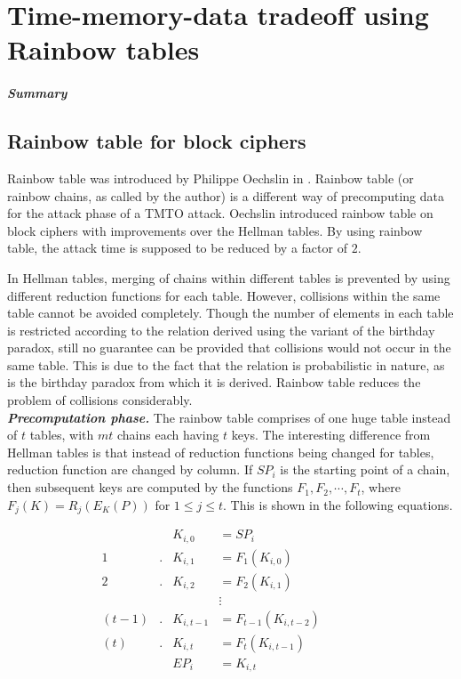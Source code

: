 \chapter{Time-memory-data tradeoff using Rainbow tables}
\label{chapter:tmdto-rainbow}

\paragraph{Summary}


\section{Rainbow table for block ciphers}
\label{sec:rainbow-block}

Rainbow table was introduced by Philippe Oechslin in \cite{oechslin:mfc}. Rainbow table (or rainbow chains, as called by the author) is a different way of precomputing data for the attack phase of a TMTO attack. Oechslin introduced rainbow table on block ciphers with improvements over the Hellman tables. By using rainbow table, the attack time is supposed to be reduced by a factor of $2$.

In Hellman tables, merging of chains within different tables is prevented by using different reduction functions for each table. However, collisions within the same table cannot be avoided completely. Though the number of elements in each table is restricted according to the relation derived using the variant of the birthday paradox, still no guarantee can be provided that collisions would not occur in the same table. This is due to the fact that the relation is probabilistic in nature, as is the birthday paradox from which it is derived. Rainbow table reduces the problem of collisions considerably.\\

\noindent \textit{\textbf{Precomputation phase.}} The rainbow table comprises of one huge table instead of $t$ tables, with $mt$ chains each having $t$ keys. The interesting difference from Hellman tables is that instead of reduction functions being changed for tables, reduction function are changed by column. If $SP_i$ is the starting point of a chain, then subsequent keys are computed by the functions \mbox{$F_1, F_2, \cdots, F_t$}, where $F_j(K) = R_j(E_{K}(P))$ for $1 \leq j \leq t$. This is shown in the following equations. 

\begin{align*}
& & K_{i,0} & = SP_i & & & &\\
1&. &K_{i,1} & = F_1(K_{i,0}) & & & &\\
2&. &K_{i,2} & = F_2(K_{i,1}) & & & &\\
& & &\vdots & & & &\\
(t-1)&. &K_{i,t-1} & = F_{t-1}(K_{i,t-2}) & & & &\\
(t)&. &K_{i,t} & = F_t(K_{i,t-1}) & & & &\\
& & EP_i & = K_{i,t} & & & &\\
\end{align*}

